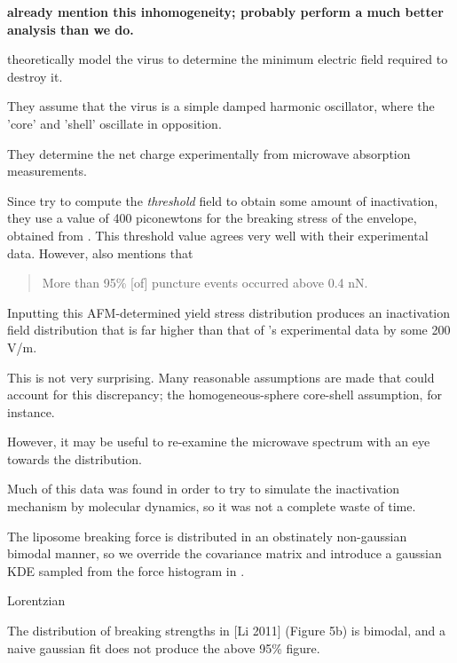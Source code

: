 \documentclass[paper.tex]{subfiles}
\begin{document}
	
\begin{center}
	{\bf \cite{Microwave2009} already mention this inhomogeneity; \cite{Elastic} probably perform a much better analysis than we do.}
\end{center}
	

\cite{Efficient2015} theoretically model the virus to determine the minimum electric field required to destroy it. 

They assume that the virus is a simple damped harmonic oscillator, where the 'core' and 'shell' oscillate in opposition. 

They determine the net charge experimentally from microwave absorption measurements.



Since \cite{Efficient2015} try to compute the {\it threshold} field to obtain some amount of inactivation, they use a value of 400 piconewtons for the breaking stress of the envelope, obtained from \cite{Bending2011}. This threshold value agrees very well with their experimental data. However, \cite{Bending2011} also mentions that 

\begin{quote}
	More than 95\% [of] puncture events occurred above 0.4 nN.
\end{quote}

Inputting this AFM-determined yield stress distribution produces an inactivation field distribution that is far higher than that of \cite{Efficient2015}'s experimental data by some 200 V/m.

This is not very surprising. Many reasonable assumptions are made that could account for this discrepancy; the homogeneous-sphere core-shell assumption, for instance.

However, it may be useful to re-examine the microwave spectrum with an eye towards the distribution. 

\begin{toolchain}
Much of this data was found in order to try to simulate the inactivation mechanism by molecular dynamics, so it was not a complete waste of time.
\end{toolchain}

The liposome breaking force is distributed in an obstinately non-gaussian bimodal manner, so we override the covariance matrix and introduce a gaussian KDE sampled from the force histogram in \cite{Bending2011}.

Lorentzian 

The distribution of breaking strengths in [Li 2011] (Figure 5b) is bimodal, and a naive gaussian fit does not produce the above 95\% figure.
\end{document}
